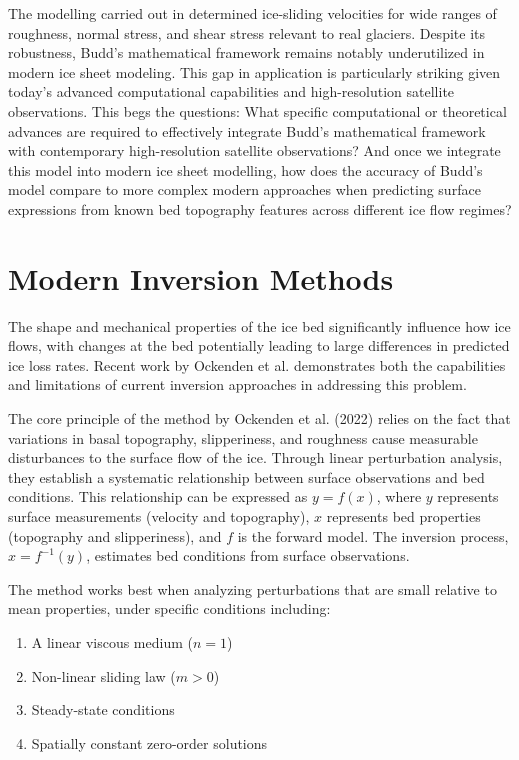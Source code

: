 The modelling carried out in\cite{Budd_1970} determined ice-sliding velocities for wide ranges of roughness, normal stress, and shear stress relevant to real glaciers\cite{Budd_1970}. Despite its robustness, Budd's mathematical framework remains notably underutilized in modern ice sheet modeling. This gap in application is particularly striking given today's advanced computational capabilities and high-resolution satellite observations. 
This begs the questions: What specific computational or theoretical advances are required to effectively integrate Budd's mathematical framework with contemporary high-resolution satellite observations? And once we integrate this model into modern ice sheet modelling, 
how does the accuracy of Budd's model compare to more complex modern approaches when predicting surface expressions from known bed topography features across different ice flow regimes?

\section{Modern Inversion Methods}\label{Ockenden_2022}

The shape and mechanical properties of the ice bed significantly influence how ice flows, with changes at the bed potentially leading to large differences in predicted ice loss rates\cite{Ockenden_2022}. Recent work by Ockenden et al. demonstrates both the capabilities and limitations of current inversion approaches in addressing this problem.

The core principle of the method by Ockenden et al. (2022) relies on the fact that variations in basal topography, slipperiness, and roughness cause measurable disturbances to the surface flow of the ice. Through linear perturbation analysis, they establish a systematic relationship between surface observations and bed conditions. This relationship can be expressed as $y=f(x)$, where $y$ represents surface measurements (velocity and topography), $x$ represents bed properties (topography and slipperiness), and $f$ is the forward model\cite{Gudmundsson_2008}. The inversion process, $x=f^{-1}(y)$, estimates bed conditions from surface observations.

The method works best when analyzing perturbations that are small relative to mean properties, under specific conditions including:
\begin{enumerate}
    \item A linear viscous medium ($n=1$)
    \item Non-linear sliding law ($m>0$)
    \item Steady-state conditions
    \item Spatially constant zero-order solutions
\end{enumerate}

